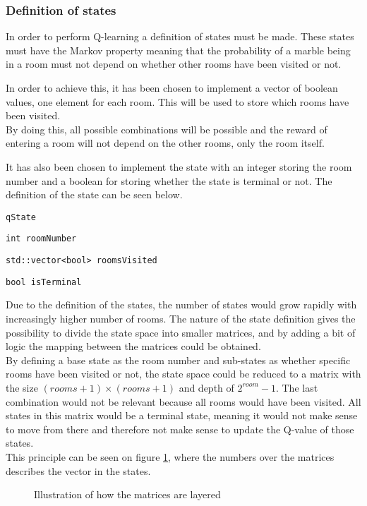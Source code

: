 \documentclass[../Head/Main.tex]{subfiles}
\begin{document}
\subsubsection{Definition of states}
In order to perform Q-learning a definition of states must be made. These states must have the Markov property meaning that the probability of a marble being in a room must not depend on whether other rooms have been visited or not.\par 
In order to achieve this, it has been chosen to implement a vector of boolean values, one element for each room. This will be used to store which rooms have been visited.\\
By doing this, all possible combinations will be possible and the reward of entering a room will not depend on the other rooms, only the room itself.\par 
It has also been chosen to implement the state with an integer storing the room number and a boolean for storing whether the state is terminal or not. The definition of the state can be seen below.
\begin{Indentation}
	\item \texttt{qState} \vspace{-2pt}
	\begin{Indentation}
		\item \texttt{int roomNumber} \vspace{-2pt}
		\item \texttt{std::vector<bool> roomsVisited} \vspace{-2pt}
		\item \texttt{bool isTerminal}
	\end{Indentation}
\end{Indentation}
Due to the definition of the states, the number of states would grow rapidly with increasingly higher number of rooms. The nature of the state definition gives the possibility to divide the state space into smaller matrices, and by adding a bit of logic the mapping between the matrices could be obtained.\\
By defining a base state as the room number and sub-states as whether specific rooms have been visited or not, the state space could be reduced to a matrix with the size $(rooms + 1)\times(rooms + 1)$ and depth of $2^{room}-1$. The last combination would not be relevant because all rooms would have been visited. All states in this matrix would be a terminal state, meaning it would not make sense to move from there and therefore not make sense to update the Q-value of those states.\\
This principle can be seen on figure \ref{fig:3D-matrix}, where the numbers over the matrices describes the vector in the states.  
\begin{figure}[H]
	\centering
	
	\caption{Illustration of how the matrices are layered}
	\label{fig:3D-matrix}
\end{figure}
\end{document}
